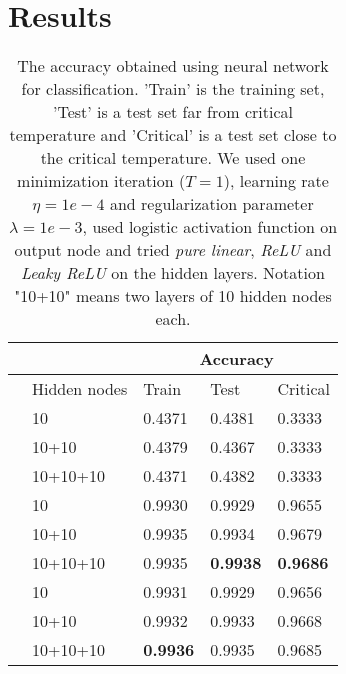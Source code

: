 \section{Results} \label{sec:results}

\iffalse
\begin{figure} [H]
	\centering
	\texttt{[image: ../plots/lambda\_vs\_R2\_linear.png]}
	\caption{The R$^2$-score as a function of the penalty. }
	\label{fig:lambda_vs_R2_linear}
\end{figure} 
\fi

\begin{table} [H]
	\caption{The accuracy obtained using neural network for classification. 'Train' is the training set, 'Test' is a test set far from critical temperature and 'Critical' is a test set close to the critical temperature. We used one minimization iteration ($T=1$), learning rate $\eta=1e-4$ and regularization parameter $\lambda=1e-3$, used logistic activation function on output node and tried \textit{pure linear}, \textit{ReLU} and \textit{Leaky ReLU} on the hidden layers. Notation "10+10" means two layers of 10 hidden nodes each.}
	\begin{tabularx}{\textwidth}{l|l|XXX} \hline\hline
		\label{tab:nn_class}
		&& \multicolumn{3}{c}{\textbf{Accuracy}}\\ \hline
		&Hidden nodes&Train&Test&Critical\\ \hline
		
		\parbox[t]{2mm}{}
		&10 & 0.4371 & 0.4381 & 0.3333 \\
		&10+10 & 0.4379 & 0.4367 & 0.3333 \\
		&10+10+10 & 0.4371 & 0.4382 & 0.3333 \\ \hline
		
		\parbox[t]{2mm}{}
		&10 & 0.9930 & 0.9929 & 0.9655 \\
		&10+10 & 0.9935 & 0.9934 & 0.9679 \\
		&10+10+10 & 0.9935 & \textbf{0.9938} & \textbf{0.9686} \\ \hline
		
		\parbox[t]{2mm}{}
		&10 & 0.9931 & 0.9929 & 0.9656 \\
		&10+10 & 0.9932 & 0.9933 & 0.9668 \\
		&10+10+10 & \textbf{0.9936} & 0.9935 & 0.9685 \\ \hline\hline
	\end{tabularx}
\end{table}

